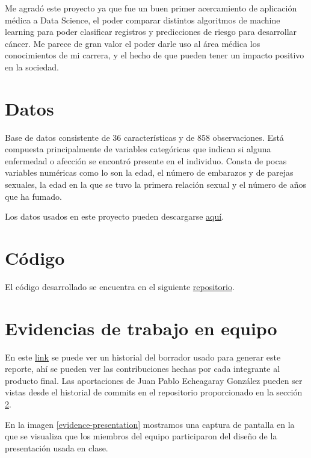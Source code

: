 \documentclass[journal]{IEEEtran}                                                          %
\begin{document}
            Me agradó este proyecto ya que fue un buen primer acercamiento de aplicación médica a Data Science, el poder comparar distintos algoritmos de machine learning para poder clasificar registros y predicciones de riesgo para desarrollar cáncer. Me parece de gran valor el poder darle uso al área médica los conocimientos de mi carrera, y el hecho de que pueden tener un impacto positivo en la sociedad.
        
    \appendices
    
    \section{Datos} \label{data}
        
        Base de datos consistente de 36 características y de 858 observaciones. Está compuesta principalmente de variables categóricas que indican si alguna enfermedad o afección se encontró presente en el individuo. Consta de pocas variables numéricas como lo son la edad, el número de embarazos y de parejas sexuales, la edad en la que se tuvo la primera relación sexual y el número de años que ha fumado.
            
        Los datos usados en este proyecto pueden descargarse \href{https://www.kaggle.com/code/ravaliraj/risk-classification-of-cervical-cancer}{aquí}.

    \section{Código}\label{repo}

        El código desarrollado se encuentra en el siguiente \href{https://github.com/JuanEcheagaray75/cancer-clf}{repositorio}.
    \section{Evidencias de trabajo en equipo}
        
        En este \href{https://docs.google.com/document/d/1febGMKH0Z8mdPzhVf\_FTBrOR3ENYA2iGw5Lfeg8XTjk/edit?usp=sharing}{link} se puede ver un historial del borrador usado para generar este reporte, ahí se pueden ver las contribuciones hechas por cada integrante al producto final. Las aportaciones de Juan Pablo Echeagaray González pueden ser vistas desde el historial de commits en el repositorio proporcionado en la sección \ref{repo}.

        En la imagen \ref{evidence-presentation} mostramos una captura de pantalla en la que se visualiza que los miembros del equipo participaron del diseño de la presentación usada en clase.
\end{document}
